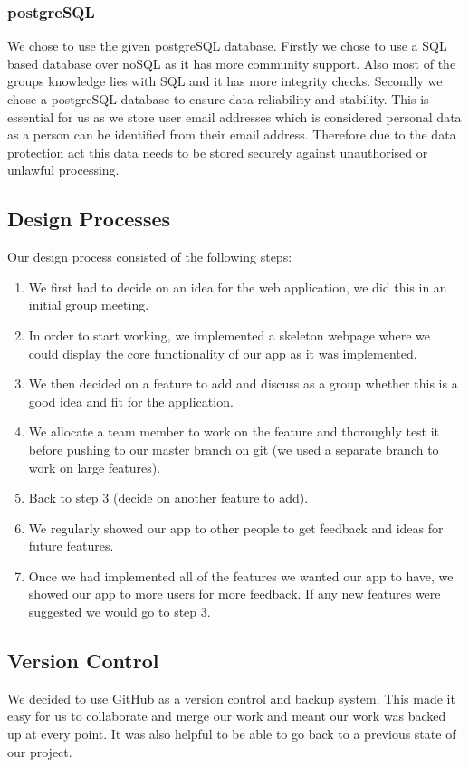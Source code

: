 \documentclass{article}
\begin{document}
\subsubsection{postgreSQL}
We chose to use the given postgreSQL database. Firstly we chose to use a SQL based database over noSQL as it has more community support. Also most of the groups knowledge lies with SQL and it has more integrity checks. Secondly we chose a postgreSQL database to ensure data reliability and stability. This is essential for us as we store user email addresses which is considered personal data as a person can be identified from their email address. Therefore due to the data protection act this data needs to be stored securely against unauthorised or unlawful processing. 
\subsection{Design Processes}
Our design process consisted of the following steps:
\begin{enumerate}
\item We first had to decide on an idea for the web application, we did this in an initial group meeting.
\item In order to start working, we implemented a skeleton webpage where we could display the core functionality of our app as it was implemented.
\item We then decided on a feature to add and discuss as a group whether this is a good idea and fit for the application.
\item We allocate a team member to work on the feature and thoroughly test it before pushing to our master branch on git (we used a separate branch to work on large features).
\item Back to step 3 (decide on another feature to add).
\item We regularly showed our app to other people to get feedback and ideas for future features.
\item Once we had implemented all of the features we wanted our app to have, we showed our app to more users for more feedback. If any new features were suggested we would go to step 3.
\end{enumerate}

\subsection{Version Control}
We decided to use GitHub as a version control and backup system. This made it easy for us to collaborate and merge our work and meant our work was backed up at every point. It was also helpful to be able to go back to a previous state of our project.
\end{document}
